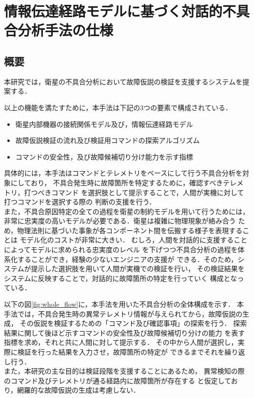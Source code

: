 \documentclass[11pt]{jsreport}
\begin{document}
\fi

\chapter{情報伝達経路モデルに基づく対話的不具合分析手法の仕様}

\section{概要}
本研究では，衛星の不具合分析において故障仮説の検証を支援するシステムを提案する．

以上の機能を満たすために，本手法は下記の3つの要素で構成されている．
\begin{itemize}
   \item 衛星内部機器の接続関係モデル及び，情報伝達経路モデル
   \item 故障仮説検証の流れ及び検証用コマンドの探索アルゴリズム %
   \item コマンドの安全性，及び故障候補切り分け能力を示す指標
\end{itemize}

具体的には，本手法はコマンドとテレメトリをベースにして行う不具合分析を対象にしており，
不具合発生時に故障箇所を特定するために，確認すべきテレメトリ，打つべきコマンド
を選択肢として提示することで，人間が実機に対して打つコマンドを選択する際の
判断の支援を行う．\\
また，不具合原因特定の全ての過程を衛星の制約モデルを用いて行うためには，%
非常に忠実度の高いモデルが必要である．衛星は複雑に物理現象が絡み合う
ため，物理法則に基づいた事象が各コンポーネント間を伝搬する様子を表現することは
モデル化のコストが非常に大きい．
むしろ，人間を対話的に支援することによってモデルに求められる忠実度のレベル
を下げつつ不具合分析の過程を体系化することができ，経験の少ないエンジニアの支援が
できる．そのため，システムが提示した選択肢を用いて人間が実機での検証を行い，
その検証結果をシステムに反映することで，対話的に故障箇所の特定を行っていく
構成となっている．



以下の図\ref{fig:whole_flow}に，本手法を用いた不具合分析の全体構成を示す．
本手法では，不具合発生時の異常テレメトリ情報が与えられてから，故障仮説の生成，
その仮説を検証するための「コマンド及び確認事項」の探索を行う．
探索結果に関して後ほど示すコマンドの安全性及び故障候補切り分けの能力
を表す指標を求め，それと共に人間に対して提示する．
その中から人間が選択し，実際に検証を行った結果を入力させ，故障箇所の特定が
できるまでそれを繰り返し行う．\\
また，本研究の主な目的は検証段階を支援することにあるため，
異常検知の際のコマンド及びテレメトリが通る経路内に故障箇所が存在する
と仮定しており，網羅的な故障仮説の生成は考慮しない．
\end{document}
